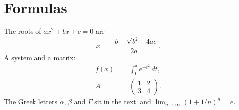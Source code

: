 \documentclass[letterpaper]{article}
\date{}
\begin{document}
\section*{Formulas}
The roots of $ax^2 + bx + c = 0$ are
\[
  x = \frac{-b \pm \sqrt{b^2 - 4ac}}{2a}.
\]
A system and a matrix:
\begin{align}
  f(x) &= \int_0^x e^{-t^2}\,dt, \\
  A &= \begin{pmatrix} 1 & 2 \\ 3 & 4 \end{pmatrix}.
\end{align}
The Greek letters $\alpha$, $\beta$ and $\Gamma$ sit in the text, and
$\lim_{n\to\infty} (1 + 1/n)^n = e$.
\end{document}
